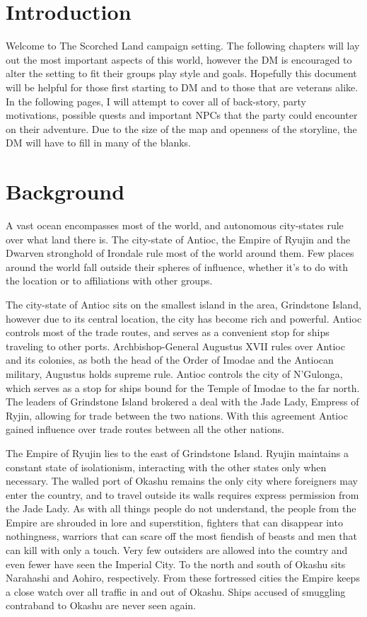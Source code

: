\section{Introduction}

Welcome to The Scorched Land campaign setting.  The following chapters will lay 
out the most important aspects of this world, however the DM is encouraged to 
alter the setting to fit their groups play style and goals.  Hopefully this document
will be helpful for those first starting to DM and to those that are veterans
alike.  In the following pages, I will attempt to cover all of back-story, party
motivations, possible quests and important NPCs that the party could encounter on 
their adventure.  Due to the size of the map and openness of the storyline, the 
DM will have to fill in many of the blanks.

\section{Background}

A vast ocean encompasses most of the world, and autonomous city-states rule over
what land there is.  The city-state of Antioc, the Empire of Ryujin and the Dwarven
stronghold of Irondale rule most of the world around them.  Few places around the 
world fall outside their spheres of influence, whether it's to do with the 
location or to affiliations with other groups.  

The city-state of Antioc sits on the smallest island in the area, Grindstone Island,
however due to its central location, the city has become rich and powerful.  Antioc
controls most of the trade routes, and serves as a convenient stop for ships 
traveling to other ports.  Archbishop-General Augustus XVII rules over Antioc and 
its colonies, as both the head of the Order of Imodae and the Antiocan military,
Augustus holds supreme rule.  Antioc controls the city of N'Gulonga, which serves 
as a stop for ships bound for the Temple of Imodae to the far north.  The leaders 
of Grindstone Island brokered a deal with the Jade Lady, Empress of Ryjin, allowing
for trade between the two nations.  With this agreement Antioc gained influence 
over trade routes between all the other nations.

The Empire of Ryujin lies to the east of Grindstone Island.  Ryujin maintains a
constant state of isolationism, interacting with the other states only when
necessary.  The walled port of Okashu remains the only city where foreigners may
enter the country, and to travel outside its walls requires express permission 
from the Jade Lady.  As with all things people do not understand, the people
 from the Empire are shrouded in lore and superstition, fighters that can disappear 
into nothingness, warriors that can scare off the most fiendish of beasts and
men that can kill with only a touch.  Very few outsiders are allowed into the 
country and even fewer have seen the Imperial City.  To the north and south of 
Okashu sits Narahashi and Aohiro, respectively.  From these fortressed cities the 
Empire keeps a close watch over all traffic in and out of Okashu.  Ships accused
of smuggling contraband to Okashu are never seen again.  

